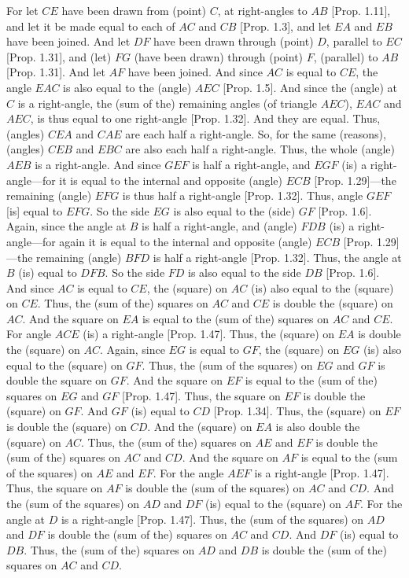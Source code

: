 \begin{Parallel}{}{}
{For let $CE$ have been drawn from (point) $C$, at right-angles to $AB$ [Prop. 1.11], and let it be made equal to each of $AC$ and $CB$ [Prop. 1.3],
and let $EA$ and $EB$ have been joined. And let $DF$ have been drawn through
(point) $D$, parallel to $EC$ [Prop. 1.31], and (let) $FG$ (have been drawn)
through (point) $F$, (parallel) to $AB$ [Prop. 1.31]. And let $AF$ have been joined.
And since $AC$ is equal to $CE$,  the angle $EAC$ is also equal to the (angle) $AEC$ [Prop. 1.5]. And since the (angle) at $C$ is a right-angle, the (sum of the) remaining angles
(of triangle $AEC$), $EAC$ and $AEC$, is thus equal to one right-angle [Prop. 1.32].
And they are equal. Thus, (angles) $CEA$ and $CAE$ are each half a right-angle.
So, for the same (reasons), (angles) $CEB$ and $EBC$ are also each half a
right-angle. Thus, the whole (angle) $AEB$ is a right-angle. And since
$GEF$ is half a right-angle, and $EGF$ (is) a right-angle---for it is
equal to the internal and opposite  (angle) $ECB$ [Prop. 1.29]---the remaining (angle) $EFG$ is thus
half a right-angle [Prop. 1.32]. Thus, angle $GEF$ [is] equal to $EFG$.
So the side $EG$ is also equal to the (side) $GF$ [Prop. 1.6]. Again, since the angle
at $B$ is half a right-angle, and (angle) $FDB$ (is) a right-angle---for again
it is equal to the internal and opposite  (angle) $ECB$ [Prop. 1.29]---the
remaining (angle) $BFD$ is half a right-angle [Prop. 1.32]. Thus, the angle
at $B$ (is) equal to $DFB$. So the side $FD$ is also equal to the side $DB$ [Prop. 1.6]. And since $AC$ is equal to $CE$,  the (square) on $AC$ (is) also equal to the (square) on $CE$. Thus, the (sum of the) squares on $AC$ and $CE$
is double the (square) on $AC$. And the square on $EA$ is equal to the (sum
of the) squares on $AC$ and $CE$. For angle $ACE$ (is) 
a right-angle [Prop. 1.47].
Thus, the (square) on $EA$ is double the (square) on $AC$. Again,  since
$EG$ is equal to $GF$, the (square) on $EG$ (is) also equal  to 
the (square) on $GF$. 
Thus, the (sum of the squares)
on $EG$ and $GF$ is double the square on $GF$.
And the square on $EF$ is equal to the (sum of the) squares on $EG$ and $GF$
[Prop. 1.47]. Thus, the square on $EF$ is double the (square) on $GF$.
And $GF$ (is) equal to $CD$ [Prop. 1.34]. Thus, the (square) on $EF$ is double the
(square) on $CD$. And the (square) on $EA$ is also double the (square) on $AC$.
Thus, the (sum of the) squares on $AE$ and $EF$ is double the (sum of the)
squares on $AC$ and $CD$. And the square on $AF$ is equal to the
(sum of the squares) on $AE$ and $EF$. For the angle $AEF$ is a right-angle [Prop. 1.47]. Thus, the square on $AF$ is double the (sum of the squares) on 
$AC$ and $CD$. And the (sum of the squares) on $AD$ and $DF$ (is) equal to
the (square) on $AF$. For the angle at $D$ is a right-angle [Prop. 1.47].
Thus, the (sum of the squares) on $AD$ and $DF$ is double the (sum of the)
squares on $AC$ and $CD$. And $DF$ (is) equal to $DB$. Thus, the
(sum of the) squares on $AD$ and $DB$ is double the (sum of the) squares on
$AC$ and $CD$.

}
\end{Parallel}
